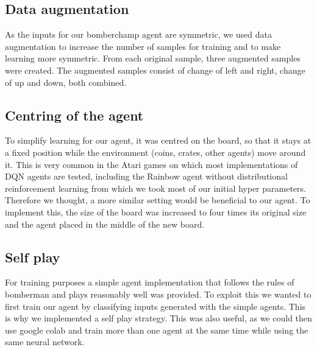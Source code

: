 \documentclass[12pt]{article}
\begin{document}
\subsection{Data augmentation}
As the inputs for our bomberchamp agent are symmetric, we used data augmentation to increase the number of samples for training and to make learning more symmetric.
From each original sample, three augmented samples were created. The augmented samples consist of change of left and right, change of up and down, both combined.
\subsection{Centring of the agent}
To simplify learning for our agent, it was centred on the board, so that it stays at a fixed position while the environment (coins, crates, other agents) move around it. This is very common in the Atari games on which most implementations of DQN agents are tested, including the Rainbow agent without distributional reinforcement learning from which we took most of our initial hyper parameters. Therefore we thought, a more similar setting would be beneficial to our agent. To implement this, the size of the board was increased to four times its original size and the agent placed in the middle of the new board.
\subsection{Self play}
For training purposes a simple agent implementation that follows the rules of bomberman and plays reasonably well was provided.
To exploit this we wanted to first train our agent by classifying inputs generated with the simple agents. %
This is why we implemented a self play strategy. This was also useful, as we could then use google colab and train more than one agent at the same time while using the same neural network.



\printbibliography
\end{document}

